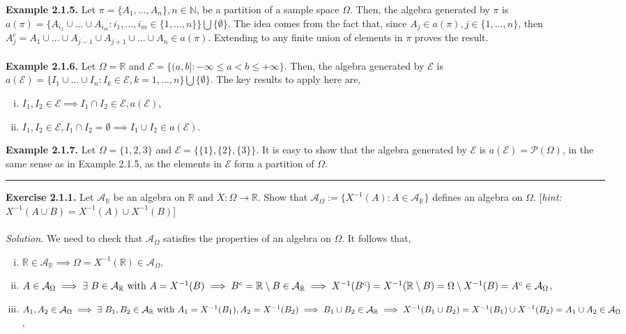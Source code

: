 \documentclass{article}
\begin{document}
\textbf{Example 2.1.5.} Let $\pi = \{A_1, ..., A_n\}, n \in \mathbb{N}$, be a partition of a sample space $\Omega$. Then, the algebra generated by $\pi$ is $a(\pi) = \{A_{i_1} \cup ...  \cup A_{i_m}: i_1,...,i_m \in \{1,...,n\}\} \bigcup \{\emptyset\}$. The idea comes from the fact that, since $A_j \in a(\pi), j \in \{1,...,n\}$, then $A_j^c = A_1 \cup ... \cup A_{j-1} \cup A_{j+1} \cup ... \cup A_n \in a(\pi)$. Extending to any finite union of elements in $\pi$ proves the result.\\\\
\textbf{Example 2.1.6.} Let $\Omega = \mathbb{R}$ and $\mathcal{E} = \{(a,b]: -\infty \leq a < b \leq +\infty\}$. Then, the algebra generated by $\mathcal{E}$ is $a(\mathcal{E}) = \{I_1 \cup ... \cup I_n: I_k \in \mathcal{E}, k=1,...,n\} \bigcup \{\emptyset\}$. The key results to apply here are,
\begin{enumerate}[(i)]
	\item $I_1, I_2 \in \mathcal{E} \implies I_1 \cap I_2 \in \mathcal{E},a(\mathcal{E})$,
	\item $I_1, I_2 \in \mathcal{E}, I_1 \cap I_2 = \emptyset \implies I_1 \cup I_2 \in a(\mathcal{E})$.
\end{enumerate}
\textbf{Example 2.1.7.} Let $\Omega = \{1,2,3\}$ and $\mathcal{E} = \{\{1\},\{2\},\{3\}\}$. It is easy to show that the algebra generated by $\mathcal{E}$ is $a(\mathcal{E}) = \mathcal{P}(\Omega)$, in the same sense as in Example 2.1.5, as the elements in $\mathcal{E}$ form a partition of $\Omega$.
\begin{center}
\noindent\rule{12cm}{0.4pt}
\end{center}
\textbf{Exercise 2.1.1.} Let $\mathcal{A}_{\mathbb{R}}$ be an algebra on $\mathbb{R}$ and $X: \Omega \to \mathbb{R}$. Show that $\mathcal{A}_{\Omega}:= \{X^{-1}(A): A \in \mathcal{A}_{\mathbb{R}}\}$ defines an algebra on $\Omega$. [\textit{hint:} $X^{-1}(A \cup B) = X^{-1}(A) \cup X^{-1}(B)$]\\\\
\textit{Solution.} We need to check that $\mathcal{A}_{\Omega}$ satisfies the properties of an algebra on $\Omega$. It follows that,
\begin{enumerate}[(i)]
	\item $\mathbb{R} \in \mathcal{A}_{\mathbb{R}} \implies \Omega = X^{-1}(\mathbb{R}) \in \mathcal{A}_{\Omega}$,
	\item $A \in \mathcal{A}_{\Omega} \implies \exists \ B \in \mathcal{A}_{\mathbb{R}} \ \text{with} \ A = X^{-1}(B) \implies B^c = \mathbb{R} \setminus B \in \mathcal{A}_{\mathbb{R}} \\ \implies X^{-1}(B^c) = X^{-1}(\mathbb{R} \setminus B) = \Omega \setminus X^{-1}(B) = A^c \in \mathcal{A}_{\Omega}$,
	\item $A_1,A_2 \in \mathcal{A}_{\Omega} \implies \exists \ B_1,B_2 \in \mathcal{A}_{\mathbb{R}} \ \text{with} \ A_1 = X^{-1}(B_1), A_2 = X^{-1}(B_2) \\ \implies B_1 \cup B_2 \in \mathcal{A}_{\mathbb{R}} \implies X^{-1}({B_1 \cup B_2}) = X^{-1}(B_1) \cup X^{-1}(B_2) = A_1 \cup A_2 \in \mathcal{A}_{\Omega}$,
\end{enumerate}
\end{document}
